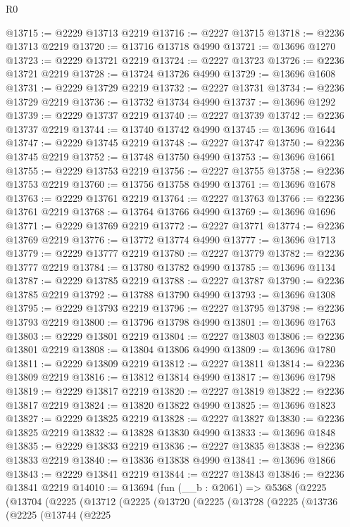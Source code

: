 \begin{lexlean}{R0}
\begin{coremodule}
@13715 := @2229 @13713 @2219
@13716 := @2227 @13715
@13718 := @2236 @13713 @2219
@13720 := @13716 @13718 @4990
@13721 := @13696 @1270
@13723 := @2229 @13721 @2219
@13724 := @2227 @13723
@13726 := @2236 @13721 @2219
@13728 := @13724 @13726 @4990
@13729 := @13696 @1608
@13731 := @2229 @13729 @2219
@13732 := @2227 @13731
@13734 := @2236 @13729 @2219
@13736 := @13732 @13734 @4990
@13737 := @13696 @1292
@13739 := @2229 @13737 @2219
@13740 := @2227 @13739
@13742 := @2236 @13737 @2219
@13744 := @13740 @13742 @4990
@13745 := @13696 @1644
@13747 := @2229 @13745 @2219
@13748 := @2227 @13747
@13750 := @2236 @13745 @2219
@13752 := @13748 @13750 @4990
@13753 := @13696 @1661
@13755 := @2229 @13753 @2219
@13756 := @2227 @13755
@13758 := @2236 @13753 @2219
@13760 := @13756 @13758 @4990
@13761 := @13696 @1678
@13763 := @2229 @13761 @2219
@13764 := @2227 @13763
@13766 := @2236 @13761 @2219
@13768 := @13764 @13766 @4990
@13769 := @13696 @1696
@13771 := @2229 @13769 @2219
@13772 := @2227 @13771
@13774 := @2236 @13769 @2219
@13776 := @13772 @13774 @4990
@13777 := @13696 @1713
@13779 := @2229 @13777 @2219
@13780 := @2227 @13779
@13782 := @2236 @13777 @2219
@13784 := @13780 @13782 @4990
@13785 := @13696 @1134
@13787 := @2229 @13785 @2219
@13788 := @2227 @13787
@13790 := @2236 @13785 @2219
@13792 := @13788 @13790 @4990
@13793 := @13696 @1308
@13795 := @2229 @13793 @2219
@13796 := @2227 @13795
@13798 := @2236 @13793 @2219
@13800 := @13796 @13798 @4990
@13801 := @13696 @1763
@13803 := @2229 @13801 @2219
@13804 := @2227 @13803
@13806 := @2236 @13801 @2219
@13808 := @13804 @13806 @4990
@13809 := @13696 @1780
@13811 := @2229 @13809 @2219
@13812 := @2227 @13811
@13814 := @2236 @13809 @2219
@13816 := @13812 @13814 @4990
@13817 := @13696 @1798
@13819 := @2229 @13817 @2219
@13820 := @2227 @13819
@13822 := @2236 @13817 @2219
@13824 := @13820 @13822 @4990
@13825 := @13696 @1823
@13827 := @2229 @13825 @2219
@13828 := @2227 @13827
@13830 := @2236 @13825 @2219
@13832 := @13828 @13830 @4990
@13833 := @13696 @1848
@13835 := @2229 @13833 @2219
@13836 := @2227 @13835
@13838 := @2236 @13833 @2219
@13840 := @13836 @13838 @4990
@13841 := @13696 @1866
@13843 := @2229 @13841 @2219
@13844 := @2227 @13843
@13846 := @2236 @13841 @2219
@14010 := @13694
    (fun (__b : @2061) =>
    @5368
      (@2225
        (@13704
          (@2225
            (@13712
              (@2225
                (@13720
                  (@2225
                    (@13728
                      (@2225
                        (@13736
                          (@2225
                            (@13744
                              (@2225

\end{coremodule}
\end{lexlean}
